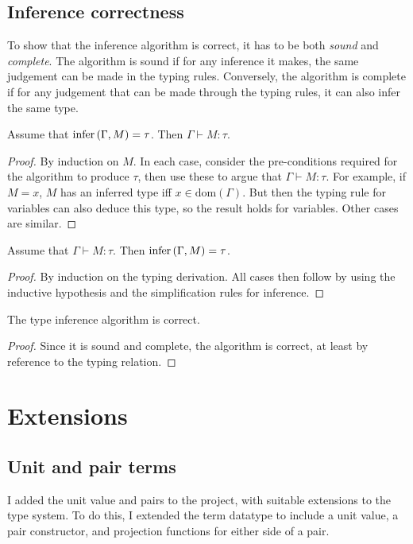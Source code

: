 \subsection{Inference correctness}
\label{sec:correctness}
To show that the inference algorithm is correct, it has to be both \emph{sound} and \emph{complete}.
The algorithm is sound if for any inference it makes, the same judgement can be made in the typing rules.
Conversely, the algorithm is complete if for any judgement that can be made through the typing rules, it can also infer the same type.

\begin{lemma}
Assume that \(\mathrm{infer}\left(\Gamma, M\right) = \tau\).
Then \(\Gamma \vdash M : \tau\).
\end{lemma}
\begin{proof}
By induction on \(M\).
In each case, consider the pre-conditions required for the algorithm to produce \(\tau\), then use these to argue that \(\Gamma \vdash M : \tau\).
For example, if \(M = x\), \(M\) has an inferred type iff \(x \in \textrm{dom}(\Gamma)\).
But then the typing rule for variables can also deduce this type, so the result holds for variables.
Other cases are similar.
\end{proof}

\begin{lemma}
Assume that \(\Gamma \vdash M : \tau\).
Then \(\mathrm{infer}\left(\Gamma, M\right) = \tau\).
\end{lemma}
\begin{proof}
By induction on the typing derivation.
All cases then follow by using the inductive hypothesis and the simplification rules for inference.
\end{proof}

\begin{theorem}
The type inference algorithm is correct.
\end{theorem}
\begin{proof}
Since it is sound and complete, the algorithm is correct, at least by reference to the typing relation.
\end{proof}

\section{Extensions}
\subsection{Unit and pair terms}
\label{sec:pairs}
I added the unit value and pairs to the project, with suitable extensions to the type system.
To do this, I extended the term datatype to include a unit value, a pair constructor, and projection functions for either side of a pair.

